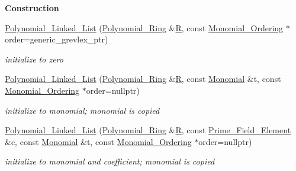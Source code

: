 \begin{Indent}\textbf{ Construction}\par
\begin{DoxyCompactItemize}
\item 
\mbox{\label{group__polygroup_a251f514b92748997c7b66abb171196cd}} 
\hyperlink{group__polygroup_a251f514b92748997c7b66abb171196cd}{Polynomial\+\_\+\+Linked\+\_\+\+List} (\hyperlink{group__polygroup_class_polynomial___ring}{Polynomial\+\_\+\+Ring} \&\hyperlink{group__polygroup_a551ade20b7dcd96c227dd0401f6ffbbe}{R}, const \hyperlink{group__orderinggroup_class_monomial___ordering}{Monomial\+\_\+\+Ordering} $\ast$order=generic\+\_\+grevlex\+\_\+ptr)
\begin{DoxyCompactList}\small\item\em initialize to zero \end{DoxyCompactList}\item 
\mbox{\label{group__polygroup_a801c742fedba1aa99a0181d12d349cba}} 
\hyperlink{group__polygroup_a801c742fedba1aa99a0181d12d349cba}{Polynomial\+\_\+\+Linked\+\_\+\+List} (\hyperlink{group__polygroup_class_polynomial___ring}{Polynomial\+\_\+\+Ring} \&\hyperlink{group__polygroup_a551ade20b7dcd96c227dd0401f6ffbbe}{R}, const \hyperlink{group__polygroup_class_monomial}{Monomial} \&t, const \hyperlink{group__orderinggroup_class_monomial___ordering}{Monomial\+\_\+\+Ordering} $\ast$order=nullptr)
\begin{DoxyCompactList}\small\item\em initialize to monomial; monomial is copied \end{DoxyCompactList}\item 
\mbox{\label{group__polygroup_a85e7e2a93687e95f706d02d462b46fc6}} 
\hyperlink{group__polygroup_a85e7e2a93687e95f706d02d462b46fc6}{Polynomial\+\_\+\+Linked\+\_\+\+List} (\hyperlink{group__polygroup_class_polynomial___ring}{Polynomial\+\_\+\+Ring} \&\hyperlink{group__polygroup_a551ade20b7dcd96c227dd0401f6ffbbe}{R}, const \hyperlink{group___fields_group_class_prime___field___element}{Prime\+\_\+\+Field\+\_\+\+Element} \&c, const \hyperlink{group__polygroup_class_monomial}{Monomial} \&t, const \hyperlink{group__orderinggroup_class_monomial___ordering}{Monomial\+\_\+\+Ordering} $\ast$order=nullptr)
\begin{DoxyCompactList}\small\item\em initialize to monomial and coefficient; monomial is copied \end{DoxyCompactList}\item 

\end{DoxyCompactItemize}
\end{Indent}
